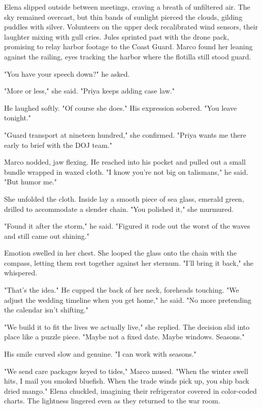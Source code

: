 Elena slipped outside between meetings, craving a breath of unfiltered air. The sky remained overcast, but thin bands of sunlight pierced the clouds, gilding puddles with silver. Volunteers on the upper deck recalibrated wind sensors, their laughter mixing with gull cries. Jules sprinted past with the drone pack, promising to relay harbor footage to the Coast Guard. Marco found her leaning against the railing, eyes tracking the harbor where the flotilla still stood guard.

"You have your speech down?" he asked.

"More or less," she said. "Priya keeps adding case law."

He laughed softly. "Of course she does." His expression sobered. "You leave tonight."

"Guard transport at nineteen hundred," she confirmed. "Priya wants me there early to brief with the DOJ team."

Marco nodded, jaw flexing. He reached into his pocket and pulled out a small bundle wrapped in waxed cloth. "I know you're not big on talismans," he said. "But humor me."

She unfolded the cloth. Inside lay a smooth piece of sea glass, emerald green, drilled to accommodate a slender chain. "You polished it," she murmured.

"Found it after the storm," he said. "Figured it rode out the worst of the waves and still came out shining."

Emotion swelled in her chest. She looped the glass onto the chain with the compass, letting them rest together against her sternum. "I'll bring it back," she whispered.

"That's the idea." He cupped the back of her neck, foreheads touching. "We adjust the wedding timeline when you get home," he said. "No more pretending the calendar isn't shifting."

"We build it to fit the lives we actually live," she replied. The decision slid into place like a puzzle piece. "Maybe not a fixed date. Maybe windows. Seasons."

His smile curved slow and genuine. "I can work with seasons."

"We send care packages keyed to tides," Marco mused. "When the winter swell hits, I mail you smoked bluefish. When the trade winds pick up, you ship back dried mango." Elena chuckled, imagining their refrigerator covered in color-coded charts. The lightness lingered even as they returned to the war room.

